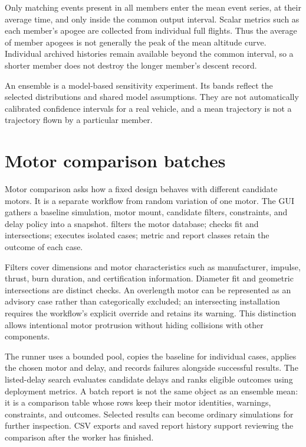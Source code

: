 Only matching events present in all members enter the mean event series, at their average time, and only inside the common output interval. Scalar metrics such as each member's apogee are collected from individual full flights. Thus the average of member apogees is not generally the peak of the mean altitude curve. Individual archived histories remain available beyond the common interval, so a shorter member does not destroy the longer member's descent record.

\begin{contract}
An ensemble is a model-based sensitivity experiment. Its bands reflect the selected distributions and shared model assumptions. They are not automatically calibrated confidence intervals for a real vehicle, and a mean trajectory is not a trajectory flown by a particular member.
\end{contract}

\section{Motor comparison batches}
Motor comparison asks how a fixed design behaves with different candidate motors. It is a separate workflow from random variation of one motor. The GUI gathers a baseline simulation, motor mount, candidate filters, constraints, and delay policy into a snapshot.  filters the motor database;  checks fit and intersections;  executes isolated cases; metric and report classes retain the outcome of each case.

Filters cover dimensions and motor characteristics such as manufacturer, impulse, thrust, burn duration, and certification information. Diameter fit and geometric intersections are distinct checks. An overlength motor can be represented as an advisory case rather than categorically excluded; an intersecting installation requires the workflow's explicit override and retains its warning. This distinction allows intentional motor protrusion without hiding collisions with other components.

The runner uses a bounded pool, copies the baseline for individual cases, applies the chosen motor and delay, and records failures alongside successful results. The listed-delay search evaluates candidate delays and ranks eligible outcomes using deployment metrics. A batch report is not the same object as an ensemble mean: it is a comparison table whose rows keep their motor identities, warnings, constraints, and outcomes. Selected results can become ordinary simulations for further inspection. CSV exports and saved report history support reviewing the comparison after the worker has finished.

